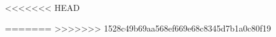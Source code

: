 \newenvironment{styleColorfulGridAccenti}{}{}
\newcommand{\textstyleBookTitle}[1]{#1}
\newcommand{\textstyleSubtleEmphasis}[1]{#1}
\newcommand{\textstylehps}[1]{#1}
<<<<<<< HEAD
\newcommand{\textstyleatn}[1]{#1}


=======
\newcommand{\textstyleatn}[1]{#1}
>>>>>>> 1528c49b69aa568ef669e68c8345d7b1a0c80f19